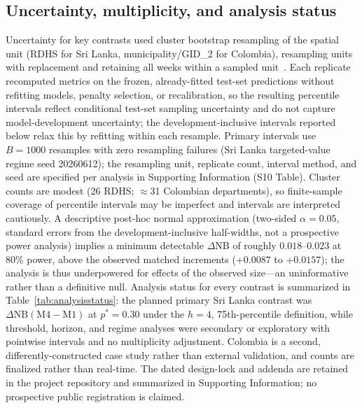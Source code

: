 \documentclass[11pt,a4paper]{article}
\begin{document}
\subsection{Uncertainty, multiplicity, and analysis status}
Uncertainty for key contrasts used cluster bootstrap resampling of the spatial unit (RDHS for Sri Lanka, municipality/GID\_2 for Colombia), resampling units with replacement and retaining all weeks within a sampled unit~\cite{CameronGelbachMiller2008}. Each replicate recomputed metrics on the frozen, already-fitted test-set predictions without refitting models, penalty selection, or recalibration, so the resulting percentile intervals reflect conditional test-set sampling uncertainty and do not capture model-development uncertainty; the development-inclusive intervals reported below relax this by refitting within each resample. Primary intervals use $B=1000$ resamples with zero resampling failures (Sri Lanka targeted-value regime seed 20260612); the resampling unit, replicate count, interval method, and seed are specified per analysis in Supporting Information (S10 Table). Cluster counts are modest (26 RDHS; $\approx$31 Colombian departments), so finite-sample coverage of percentile intervals may be imperfect and intervals are interpreted cautiously. A descriptive post-hoc normal approximation (two-sided $\alpha=0.05$, standard errors from the development-inclusive half-widths, not a prospective power analysis) implies a minimum detectable $\Delta$NB of roughly $0.018$--$0.023$ at 80\% power, above the observed matched increments ($+0.0087$ to $+0.0157$); the analysis is thus underpowered for effects of the observed size---an uninformative rather than a definitive null. Analysis status for every contrast is summarized in Table~\ref{tab:analysisstatus}: the planned primary Sri Lanka contrast was $\Delta\mathrm{NB}(\text{M4}-\text{M1})$ at $p^*=0.30$ under the $h=4$, 75th-percentile definition, while threshold, horizon, and regime analyses were secondary or exploratory with pointwise intervals and no multiplicity adjustment. Colombia is a second, differently-constructed case study rather than external validation, and counts are finalized rather than real-time. The dated design-lock and addenda are retained in the project repository and summarized in Supporting Information; no prospective public registration is claimed.
\end{document}

